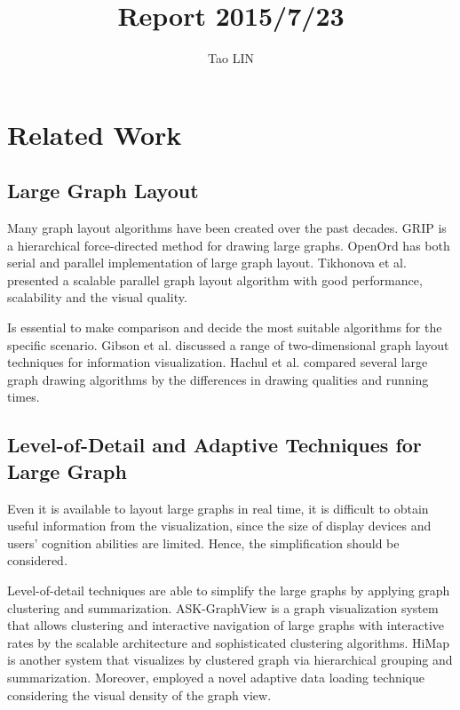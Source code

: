 \documentclass{article}
\title{Report 2015/7/23}
\author{Tao LIN}
\begin{document}
\maketitle

\section{Related Work}

\subsection{Large Graph Layout}

Many graph layout algorithms have been created over the past decades. 
GRIP\cite{gajer2000fast,gajer2001grip} is a hierarchical force-directed method for drawing large graphs.
OpenOrd\cite{martin2011openord} has both serial and parallel implementation of large graph layout.
Tikhonova et al.\cite{tikhonova2008scalable} presented a scalable parallel graph layout algorithm with good performance, scalability and the visual quality.

Is essential to make comparison and decide the most suitable algorithms for the specific scenario. Gibson et al.\cite{gibson2013survey} discussed a range of two-dimensional graph layout techniques for information visualization. Hachul et al.\cite{hachul2006experimental} compared several large graph drawing algorithms by the differences in drawing qualities and running times.
 


\subsection{Level-of-Detail and Adaptive Techniques for Large Graph}

Even it is available to layout large graphs in real time, it is difficult to obtain useful information from the visualization, since the size of display devices and users' cognition abilities are limited. Hence, the simplification should be considered.

Level-of-detail techniques are able to simplify the large graphs by applying graph clustering and summarization. ASK-GraphView\cite{abello2006ask} is a graph visualization system that allows clustering and interactive
navigation of large graphs with interactive rates by the scalable architecture and sophisticated clustering algorithms.
HiMap\cite{shi2009himap} is another system that visualizes by clustered graph via hierarchical grouping and summarization. Moreover, employed a novel adaptive data loading technique considering the visual density of the graph view.
\end{document}
